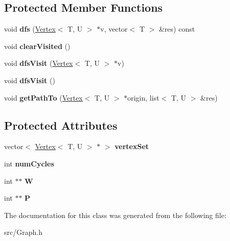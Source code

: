 \subsection*{Protected Member Functions}
\begin{DoxyCompactItemize}
\item 
void {\bfseries dfs} (\hyperlink{class_vertex}{Vertex}$<$ T, U $>$ $\ast$v, vector$<$ T $>$ \&res) const \hypertarget{class_graph_aa47ebf60f3479c57d4383191cc33b4a2}{}\label{class_graph_aa47ebf60f3479c57d4383191cc33b4a2}

\item 
void {\bfseries clear\+Visited} ()\hypertarget{class_graph_ab6533a9af91decb214f0b62088faf863}{}\label{class_graph_ab6533a9af91decb214f0b62088faf863}

\item 
void {\bfseries dfs\+Visit} (\hyperlink{class_vertex}{Vertex}$<$ T, U $>$ $\ast$v)\hypertarget{class_graph_abece56ebb00b3579ae8275807ed85657}{}\label{class_graph_abece56ebb00b3579ae8275807ed85657}

\item 
void {\bfseries dfs\+Visit} ()\hypertarget{class_graph_a045e231b883b47a01bbfd1a8f58fec52}{}\label{class_graph_a045e231b883b47a01bbfd1a8f58fec52}

\item 
void {\bfseries get\+Path\+To} (\hyperlink{class_vertex}{Vertex}$<$ T, U $>$ $\ast$origin, list$<$ T, U $>$ \&res)\hypertarget{class_graph_a14abd237d69bdd56e1c5adaf73fa15c3}{}\label{class_graph_a14abd237d69bdd56e1c5adaf73fa15c3}

\end{DoxyCompactItemize}
\subsection*{Protected Attributes}
\begin{DoxyCompactItemize}
\item 
vector$<$ \hyperlink{class_vertex}{Vertex}$<$ T, U $>$ $\ast$ $>$ {\bfseries vertex\+Set}\hypertarget{class_graph_a2f0f9806ac2944ee5cb73c69de96867c}{}\label{class_graph_a2f0f9806ac2944ee5cb73c69de96867c}

\item 
int {\bfseries num\+Cycles}\hypertarget{class_graph_a8dccf6b855b1232ce0f4e6de67610aee}{}\label{class_graph_a8dccf6b855b1232ce0f4e6de67610aee}

\item 
int $\ast$$\ast$ {\bfseries W}\hypertarget{class_graph_a7121077a76f16c21dc34697dc8b82192}{}\label{class_graph_a7121077a76f16c21dc34697dc8b82192}

\item 
int $\ast$$\ast$ {\bfseries P}\hypertarget{class_graph_ad1a4b2e4829750923387ecd3a8c770c4}{}\label{class_graph_ad1a4b2e4829750923387ecd3a8c770c4}

\end{DoxyCompactItemize}


The documentation for this class was generated from the following file\+:\begin{DoxyCompactItemize}
\item 
src/Graph.\+h\end{DoxyCompactItemize}
